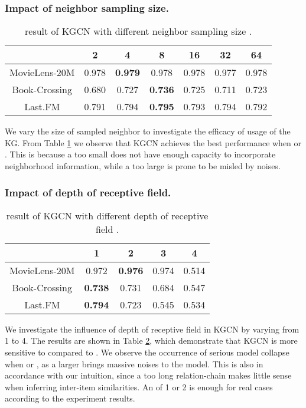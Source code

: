 \documentclass[sigconf]{acmart}
\begin{document}
		
		\subsubsection{Impact of neighbor sampling size.}
			\begin{table}[t]
				\centering
				\setlength{\tabcolsep}{4pt}
				\caption{ result of KGCN with different neighbor sampling size .}
				\begin{tabular}{c|cccccc}
					\hline
					 & 2 & 4 & 8 & 16 & 32 & 64\\
					\hline
					MovieLens-20M & 0.978 & \textbf{0.979} & 0.978 & 0.978 & 0.977 & 0.978\\
					Book-Crossing & 0.680 & 0.727 & \textbf{0.736} & 0.725 & 0.711 & 0.723\\
					Last.FM & 0.791 & 0.794 & \textbf{0.795} & 0.793 & 0.794 & 0.792\\
					\hline
				\end{tabular}
				\label{table:K}
			\end{table}	
			
			We vary the size of sampled neighbor  to investigate the efficacy of usage of the KG.
			From Table \ref{table:K} we observe that KGCN achieves the best performance when  or .
			This is because a too small  does not have enough capacity to incorporate neighborhood information, while a too large  is prone to be misled by noises.
			
		\subsubsection{Impact of depth of receptive field.}
			\begin{table}[t]
				\centering
				\setlength{\tabcolsep}{8pt}
				\caption{ result of KGCN with different depth of receptive field .}
				\begin{tabular}{c|cccc}
					\hline
					 & 1 & 2 & 3 & 4\\
					\hline
					MovieLens-20M & 0.972 & \textbf{0.976} & 0.974 & 0.514\\
					Book-Crossing & \textbf{0.738} & 0.731 & 0.684 & 0.547\\
					Last.FM & \textbf{0.794} & 0.723 & 0.545 & 0.534\\
					\hline
				\end{tabular}
				\label{table:H}
			\end{table}
			
			We investigate the influence of depth of receptive field in KGCN by varying  from 1 to 4.
			The results are shown in Table \ref{table:H}, which demonstrate that KGCN is more sensitive to  compared to .
			We observe the occurrence of serious model collapse when  or , as a larger  brings massive noises to the model.
			This is also in accordance with our intuition, since a too long relation-chain makes little sense when inferring inter-item similarities.
			An  of 1 or 2 is enough for real cases according to the experiment results.
			
\end{document}
